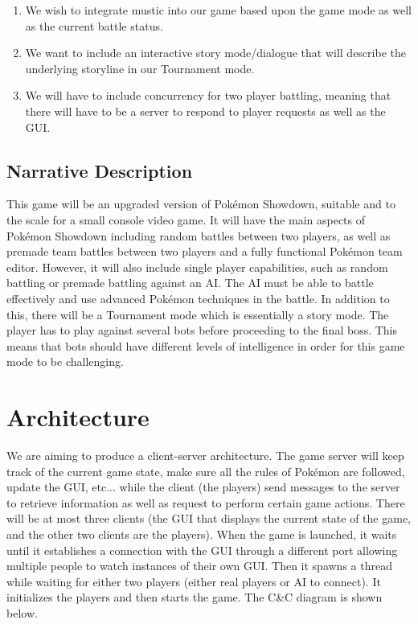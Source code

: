 \documentclass{scrreprt}
\begin{document}
\begin{enumerate}
	\item We wish to integrate mustic into our game based upon the game mode as well as the current battle status.
	\item We want to include an interactive story mode/dialogue that will describe the underlying storyline in our Tournament mode. 
	\item We will have to include concurrency for two player battling, meaning that there will have to be a server to respond to player requests as well as the GUI. 
\end{enumerate}

\section{Narrative Description}
	This game will be an upgraded version of Pok\'emon Showdown, suitable and to the scale for a small console video game. It will have the main aspects of Pok\'emon Showdown including random battles between two players, as well as premade team battles between two players and a fully functional Pok\'emon team editor. However, it will also include single player capabilities, such as random battling or premade battling against an AI. The AI must be able to battle effectively and use advanced Pok\'emon techniques in the battle. In addition to this, there will be a Tournament mode which is essentially a story mode. The player has to play against several bots before proceeding to the final boss. This means that bots should have different levels of intelligence in order for this game mode to be challenging. 
\chapter{Architecture}
	We are aiming to produce a client-server architecture. The game server will keep track of the current game state, make sure all the rules of Pok\'emon are followed, update the GUI, etc... while the client (the players) send messages to the server to retrieve information as well as request to perform certain game actions. There will be at most three clients (the GUI that displays the current state of the game, and the other two clients are the players). When the game is launched, it waits until it establishes a connection with the GUI through a different port allowing multiple people to watch instances of their own GUI. Then it spawns a thread while waiting for either two players (either real players or AI to connect). It initializes the players and then starts the game. The C\&C diagram is shown below. 
	
\end{document}
